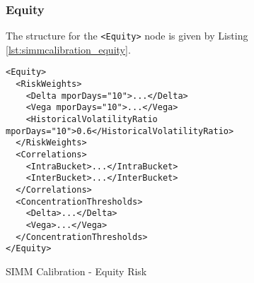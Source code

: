 \subsubsection{Equity}
The structure for the {\tt <Equity>} node is given by Listing \ref{lst:simmcalibration_equity}.

\begin{listing}[H]
\begin{verbatim}
<Equity>
  <RiskWeights>
    <Delta mporDays="10">...</Delta>
    <Vega mporDays="10">...</Vega>
    <HistoricalVolatilityRatio mporDays="10">0.6</HistoricalVolatilityRatio>
  </RiskWeights>
  <Correlations>
    <IntraBucket>...</IntraBucket>
    <InterBucket>...</InterBucket>
  </Correlations>
  <ConcentrationThresholds>
    <Delta>...</Delta>
    <Vega>...</Vega>
  </ConcentrationThresholds>
</Equity>
\end{verbatim}
\caption{SIMM Calibration - Equity Risk}
\label{lst:simmcalibration_equity}
\end{listing}

